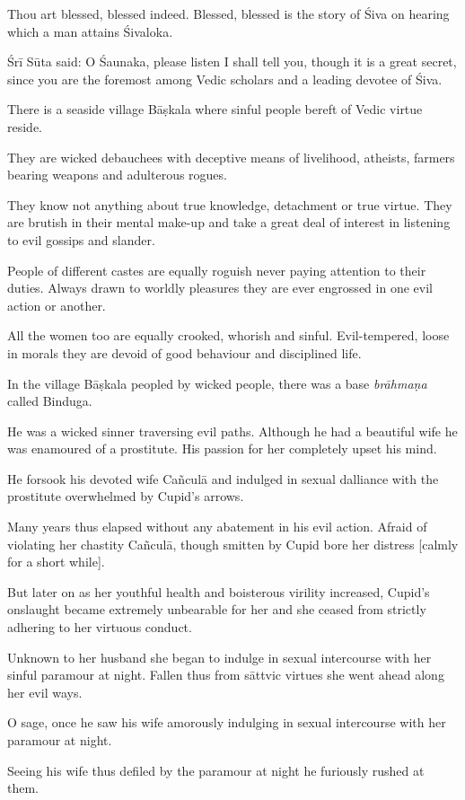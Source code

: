 \documentclass[twoside]{purana}
\begin{document}
Thou art blessed, blessed indeed. Blessed, blessed is the story of Śiva on
hearing which a man attains Śivaloka.

Śrī Sūta said: O Śaunaka, please listen I shall tell you, though it is a great
secret, since you are the foremost among Vedic scholars and a leading devotee
of Śiva.

There is a seaside village Bāṣkala where sinful people bereft of Vedic virtue
reside.

They are wicked debauchees with deceptive means of livelihood, atheists, farmers
bearing weapons and adulterous rogues.

They know not anything about true knowledge, detachment or true virtue. They are
brutish in their mental make-up and take a great deal of interest in listening
to evil gossips and slander.

People of different castes are equally roguish never paying attention to their
duties. Always drawn to worldly pleasures they are ever engrossed in one evil
action or another.

All the women too are equally crooked, whorish and sinful. Evil-tempered, loose
in morals they are devoid of good behaviour and disciplined life.

In the village Bāṣkala peopled by wicked people, there was a base
\emph{brāhmaṇa} called Binduga.

He was a wicked sinner traversing evil paths. Although he had a beautiful wife
he was enamoured of a prostitute. His passion for her completely upset his mind.

He forsook his devoted wife Cañculā and indulged in sexual dalliance with the
prostitute overwhelmed by Cupid’s arrows.

Many years thus elapsed without any abatement in his evil action. Afraid of
violating her chastity Cañculā, though smitten by Cupid bore her distress
  [calmly for a short while].

But later on as her youthful health and boisterous virility increased, Cupid’s
onslaught became extremely unbearable for her and she ceased from strictly
adhering to her virtuous conduct.

Unknown to her husband she began to indulge in sexual intercourse with her
sinful paramour at night. Fallen thus from sāttvic virtues she went ahead along
her evil ways.

O sage, once he saw his wife amorously indulging in sexual intercourse with her
paramour at night.

Seeing his wife thus defiled by the paramour at night he furiously rushed
at them.
\end{document}
